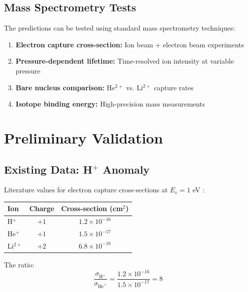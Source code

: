 \documentclass[twocolumn,10pt,a4paper]{article}
\theoremstyle{definition}
\theoremstyle{remark}
\begin{document}
\subsection{Mass Spectrometry Tests}

The predictions can be tested using standard mass spectrometry techniques:

\begin{enumerate}
    \item \textbf{Electron capture cross-section:} Ion beam + electron beam experiments
    \item \textbf{Pressure-dependent lifetime:} Time-resolved ion intensity at variable pressure
    \item \textbf{Bare nucleus comparison:} He$^{2+}$ vs. Li$^{2+}$ capture rates
    \item \textbf{Isotope binding energy:} High-precision mass measurements
\end{enumerate}

\section{Preliminary Validation}
\label{sec:validation}

\subsection{Existing Data: H$^+$ Anomaly}

Literature values for electron capture cross-sections at $E_e = 1$ eV \cite{janev1987}:

\begin{center}
\begin{tabular}{lcc}
\toprule
Ion & Charge & Cross-section (cm$^2$) \\
\midrule
H$^+$ & $+1$ & $1.2 \times 10^{-16}$ \\
He$^+$ & $+1$ & $1.5 \times 10^{-17}$ \\
Li$^{2+}$ & $+2$ & $6.8 \times 10^{-18}$ \\
\bottomrule
\end{tabular}
\end{center}

The ratio:
\begin{equation}
    \frac{\sigma_{\text{H}^+}}{\sigma_{\text{He}^+}} = \frac{1.2 \times 10^{-16}}{1.5 \times 10^{-17}} = 8
\end{equation}
\end{document}
